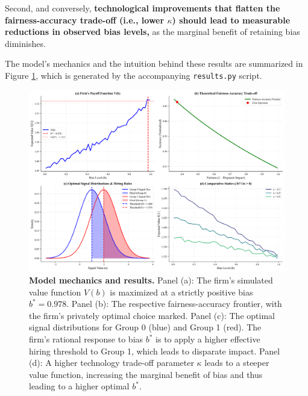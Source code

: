         Second, and conversely, \textbf{technological improvements that flatten the fairness-accuracy trade-off (i.e., lower $\kappa$) should lead to measurable reductions in observed bias levels,} as the marginal benefit of retaining bias diminishes.

The model's mechanics and the intuition behind these results are summarized in Figure \ref{fig:main_results}, which is generated by the accompanying \texttt{results.py} script.

\begin{figure}[H]
    \centering
    \includegraphics[width=\textwidth]{../figures/figure_1_model_mechanics.png}
    \caption[Model mechanics and results]{\textbf{Model mechanics and results.} 
    Panel (a): The firm's simulated value function $V(b)$ is maximized at a strictly positive bias $b^*=0.978$. 
    Panel (b): The respective fairness-accuracy frontier, with the firm's privately optimal choice marked. 
    Panel (c): The optimal signal distributions for Group 0 (blue) and Group 1 (red). The firm's rational response to bias $b^*$ is to apply a higher effective hiring threshold to Group 1, which leads to disparate impact.
    Panel (d): A higher technology trade-off parameter $\kappa$ leads to a steeper value function, increasing the marginal benefit of bias and thus leading to a higher optimal $b^*$.}
    \label{fig:main_results}
\end{figure}